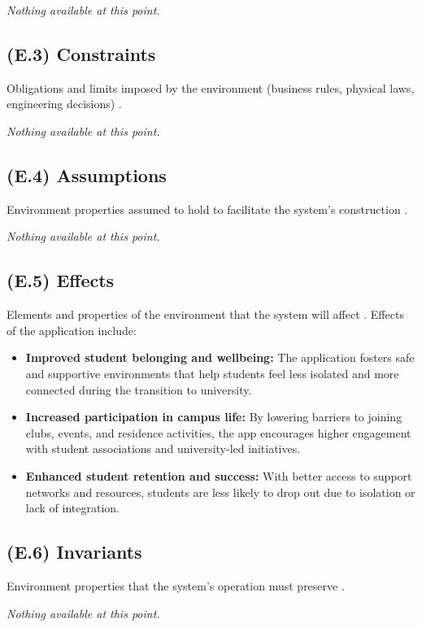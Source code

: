 \documentclass[12pt,letterpaper]{article}
\begin{document}
\textit{Nothing available at this point.}

\subsection{(E.3) Constraints}
Obligations and limits imposed by the environment (business rules, physical laws, engineering decisions) \cite{meyer2022}.

\textit{Nothing available at this point.}

\subsection{(E.4) Assumptions}
Environment properties assumed to hold to facilitate the system’s construction \cite{meyer2022}.

\textit{Nothing available at this point.}

\subsection{(E.5) Effects}
Elements and properties of the environment that the system will affect \cite{meyer2022}. Effects of the application include:
\begin{itemize}
  \item \textbf{Improved student belonging and wellbeing:} The application fosters safe and supportive environments that help students feel less isolated and more connected during the transition to university.
  \item \textbf{Increased participation in campus life:} By lowering barriers to joining clubs, events, and residence activities, the app encourages higher engagement with student associations and university-led initiatives.
  \item \textbf{Enhanced student retention and success:} With better access to support networks and resources, students are less likely to drop out due to isolation or lack of integration.
\end{itemize}

\subsection{(E.6) Invariants}
Environment properties that the system’s operation must preserve \cite{meyer2022}.

\textit{Nothing available at this point.}

\clearpage

\end{document}

